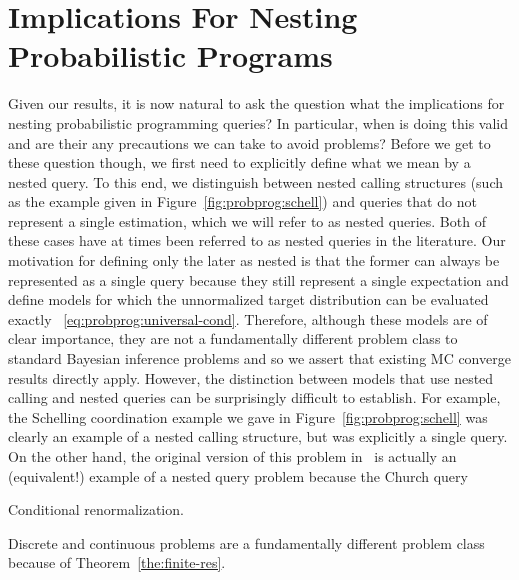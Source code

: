 
\section{Implications For Nesting Probabilistic Programs}
\label{sec:design:imp}

Given our results, it is now natural to ask the question what the implications
for nesting probabilistic programming queries?  In particular, when is doing
this valid and are their any precautions we can take to avoid problems?  Before
we get to these question though, we first need to explicitly define what we
mean by a nested query.  To this end, we distinguish between nested calling
structures (such as the example given in Figure~\ref{fig:probprog:schell}) and
queries that do not represent a single estimation, which we will refer
to as nested queries.  Both of these cases have at times been referred to as
nested queries in the literature.  Our motivation for defining only the later
as nested is that the former can always be represented as a single
query because they still represent a single expectation and define models
for which the unnormalized target distribution can be evaluated exactly
~\eqref{eq:probprog:universal-cond}.  Therefore, although these models are
of clear importance, they are not a fundamentally different problem class
to standard Bayesian inference problems and so we assert that existing MC
converge results directly apply.  However, the distinction between models that
use nested calling and nested queries can be surprisingly difficult to establish.
For example, the Schelling coordination example we gave in Figure~\ref{fig:probprog:schell}
was clearly an example of a nested calling structure, but was explicitly a single query.
On the other hand, the original version of this problem in~\cite[]{stuhlmuller2014reasoning}
is actually an (equivalent!) example of a nested query problem because the Church
query 

Conditional renormalization.

Discrete and continuous problems are a fundamentally different problem class
because of Theorem~\ref{the:finite-res}.



